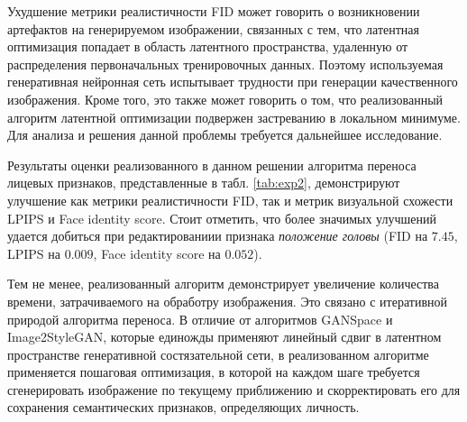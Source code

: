 Ухудшение метрики реалистичности FID может говорить о возникновении артефактов на генерируемом изображении, связанных с тем, что латентная оптимизация попадает в область латентного пространства, удаленную от распределения первоначальных тренировочных данных.
Поэтому используемая генеративная нейронная сеть испытывает трудности при генерации качественного изображения.
Кроме того, это также может говорить о том, что реализованный алгоритм латентной оптимизации подвержен застреванию в локальном минимуме. Для анализа и решения данной проблемы требуется дальнейшее исследование.

Результаты оценки реализованного в данном решении алгоритма переноса лицевых признаков, представленные в табл. \ref{tab:exp2}, демонстрируют улучшение как метрики реалистичности FID, так и метрик визуальной схожести LPIPS и Face identity score.
Стоит отметить, что более значимых улучшений удается добиться при редактированиии признака \emph{положение головы} (FID на $7.45$, LPIPS на $0.009$, Face identity score на $0.052$).

Тем не менее, реализованный алгоритм демонстрирует увеличение количества времени, затрачиваемого на обработру изображения.
Это связано с итеративной природой алгоритма переноса.
В отличие от алгоритмов GANSpace и Image2StyleGAN, которые единожды применяют линейный сдвиг в латентном пространстве генеративной состязательной сети, в реализованном алгоритме применяется пошаговая оптимизация, в которой на каждом шаге требуется сгенерировать изображение по текущему приближению и скорректировать его для сохранения семантических признаков, определяющих личность.